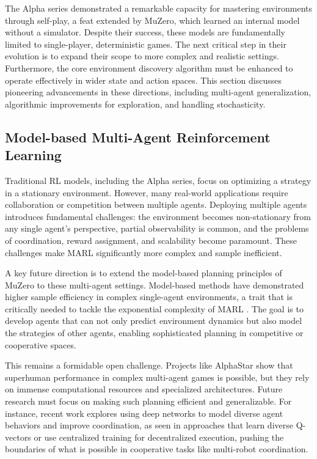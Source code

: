 
\label{sec:future}

The Alpha series demonstrated a remarkable capacity for mastering environments through self-play, a feat extended by MuZero, which learned an internal model without a simulator. Despite their success, these models are fundamentally limited to single-player, deterministic games. The next critical step in their evolution is to expand their scope to more complex and realistic settings. Furthermore, the core environment discovery algorithm must be enhanced to operate effectively in wider state and action spaces. This section discusses pioneering advancements in these directions, including multi-agent generalization, algorithmic improvements for exploration, and handling stochasticity.

\subsection{Model-based Multi-Agent Reinforcement Learning}
\label{subsec:multiagent}

Traditional RL models, including the Alpha series, focus on optimizing a strategy in a stationary environment. However, many real-world applications require collaboration or competition between multiple agents. Deploying multiple agents introduces fundamental challenges: the environment becomes non-stationary from any single agent's perspective, partial observability is common, and the problems of coordination, reward assignment, and scalability become paramount. These challenges make MARL significantly more complex and sample inefficient.

A key future direction is to extend the model-based planning principles of MuZero to these multi-agent settings. Model-based methods have demonstrated higher sample efficiency in complex single-agent environments, a trait that is critically needed to tackle the exponential complexity of MARL \cite{wang2023model}. The goal is to develop agents that can not only predict environment dynamics but also model the strategies of other agents, enabling sophisticated planning in competitive or cooperative spaces.

This remains a formidable open challenge. Projects like AlphaStar \cite{vinyals2019alphastar} show that superhuman performance in complex multi-agent games is possible, but they rely on immense computational resources and specialized architectures. Future research must focus on making such planning efficient and generalizable. For instance, recent work explores using deep networks to model diverse agent behaviors and improve coordination, as seen in approaches that learn diverse Q-vectors \cite{luo2023multi} or use centralized training for decentralized execution, pushing the boundaries of what is possible in cooperative tasks like multi-robot coordination.

